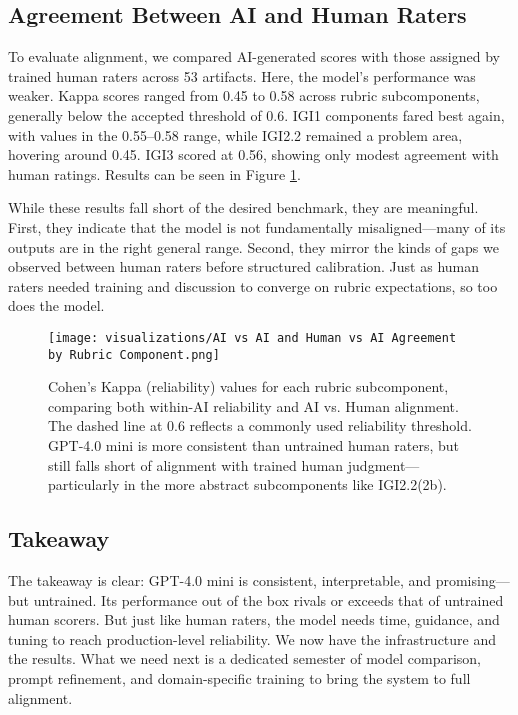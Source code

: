 \documentclass[12pt]{article}%
\begin{document}
\subsection*{Agreement Between AI and Human Raters}

To evaluate alignment, we compared AI-generated scores with those assigned by trained human raters across 53 artifacts. Here, the model’s performance was weaker. Kappa scores ranged from 0.45 to 0.58 across rubric subcomponents, generally below the accepted threshold of 0.6. IGI1 components fared best again, with values in the 0.55–0.58 range, while IGI2.2 remained a problem area, hovering around 0.45. IGI3 scored at 0.56, showing only modest agreement with human ratings. Results can be seen in Figure \ref{fig:aivshuman}.

While these results fall short of the desired benchmark, they are meaningful. First, they indicate that the model is not fundamentally misaligned—many of its outputs are in the right general range. Second, they mirror the kinds of gaps we observed between human raters before structured calibration. Just as human raters needed training and discussion to converge on rubric expectations, so too does the model.

\begin{figure}[h]
    \centering
    \texttt{[image: visualizations/AI vs AI and Human vs AI Agreement by Rubric Component.png]}
    \caption{Cohen's Kappa (reliability) values for each rubric subcomponent, comparing both within-AI reliability and AI vs. Human alignment. The dashed line at 0.6 reflects a commonly used reliability threshold. GPT-4.0 mini is more consistent than untrained human raters, but still falls short of alignment with trained human judgment—particularly in the more abstract subcomponents like IGI2.2(2b).}
    \label{fig:aivshuman}
\end{figure}

\subsection*{Takeaway}

The takeaway is clear: GPT-4.0 mini is consistent, interpretable, and promising—but untrained. Its performance out of the box rivals or exceeds that of untrained human scorers. But just like human raters, the model needs time, guidance, and tuning to reach production-level reliability. We now have the infrastructure and the results. What we need next is a dedicated semester of model comparison, prompt refinement, and domain-specific training to bring the system to full alignment.
\end{document}
